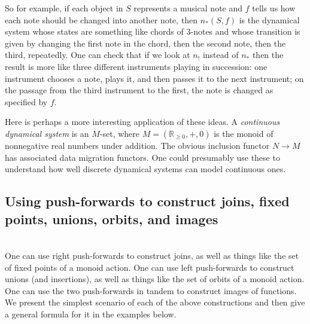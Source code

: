 \documentclass{amsart}
\def\RR{{\mathbb R}}
\def\to{\rightarrow}
\theoremstyle{remark}
\theoremstyle{definition}
\begin{document}
So for example, if each object in $S$ represents a musical note and $f$ tells us how each note should be changed into another note, then $n_*(S,f)$ is the dynamical system whose states are something like chords of 3-notes and whose transition is given by changing the first note in the chord, then the second note, then the third, repeatedly.  One can check that if we look at $n_!$ instead of $n_*$ then the result is more like three different instruments playing in succession: one instrument chooses a note, plays it, and then passes it to the next instrument; on the passage from the third instrument to the first, the note is changed as specified by $f$.

Here is perhaps a more interesting application of these ideas.  A {\em continuous dynamical system} is an $M$-set, where $M=(\RR_{\geq 0},+,0)$ is the monoid of nonnegative real numbers under addition.  The obvious inclusion functor $N\to M$ has associated data migration functors.  One could presumably use these to understand how well discrete dynamical systems can model continuous ones.


\subsection{Using push-forwards to construct joins, fixed points, unions, orbits, and images}\label{sec:using to construct}~\\

One can use right push-forwards to construct joins, as well as things like the set of fixed points of a monoid action.  One can use left push-forwards to construct unions (and insertions), as well as things like the set of orbits of a monoid action.  One can use the two push-forwards in tandem to construct images of functions.  We present the simplest scenario of each of the above constructions and then give a general formula for it in the examples below.
\end{document}
